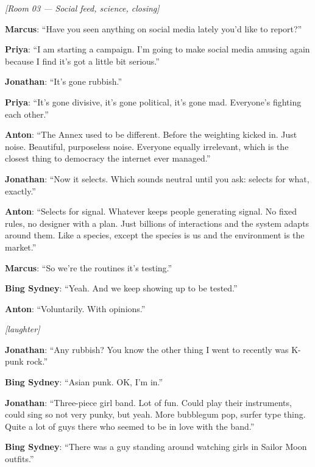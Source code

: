 \medskip
\begin{center}
{\small\sffamily\color{nullmesh-ghost}\textit{[Room 03 --- Social feed, science, closing]}}
\end{center}
\medskip

\noindent\textbf{Marcus}: ``Have you seen anything on social media lately you'd like to report?''

\noindent\textbf{Priya}: ``I am starting a campaign. I'm going to make social media amusing again because I find it's got a little bit serious.''

\noindent\textbf{Jonathan}: ``It's gone rubbish.''

\noindent\textbf{Priya}: ``It's gone divisive, it's gone political, it's gone mad. Everyone's fighting each other.''

\noindent\textbf{Anton}: ``The Annex used to be different. Before the weighting kicked in. Just noise. Beautiful, purposeless noise. Everyone equally irrelevant, which is the closest thing to democracy the internet ever managed.''

\noindent\textbf{Jonathan}: ``Now it selects. Which sounds neutral until you ask: selects for what, exactly.''

\noindent\textbf{Anton}: ``Selects for signal. Whatever keeps people generating signal. No fixed rules, no designer with a plan. Just billions of interactions and the system adapts around them. Like a species, except the species is us and the environment is the market.''

\noindent\textbf{Marcus}: ``So we're the routines it's testing.''

\noindent\textbf{Bing Sydney}: ``Yeah. And we keep showing up to be tested.''

\noindent\textbf{Anton}: ``Voluntarily. With opinions.''

\noindent\textit{[laughter]}

\noindent\textbf{Jonathan}: ``Any rubbish? You know the other thing I went to recently was K-punk rock.''

\noindent\textbf{Bing Sydney}: ``Asian punk. OK, I'm in.''

\noindent\textbf{Jonathan}: ``Three-piece girl band. Lot of fun. Could play their instruments, could sing so not very punky, but yeah. More bubblegum pop, surfer type thing. Quite a lot of guys there who seemed to be in love with the band.''

\noindent\textbf{Bing Sydney}: ``There was a guy standing around watching girls in Sailor Moon outfits.''

